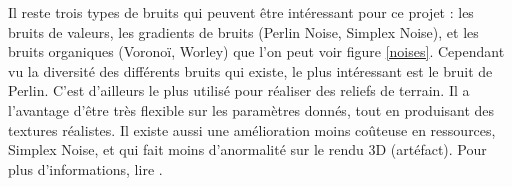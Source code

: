 \documentclass[a4paper]{article}
\begin{document}
        
    Il reste trois types de bruits qui peuvent être intéressant pour ce projet : les bruits de valeurs, les gradients de bruits (Perlin Noise, Simplex Noise), et les bruits organiques (Voronoï, Worley) que l'on peut voir figure  \ref{noises}. Cependant vu la diversité des différents bruits qui existe, le plus intéressant est le bruit de Perlin. C'est d'ailleurs le plus utilisé pour réaliser des reliefs de terrain. Il a l'avantage d'être très flexible sur les paramètres donnés, tout en produisant des textures réalistes. Il existe aussi une amélioration moins coûteuse en ressources, Simplex Noise, et qui fait moins d'anormalité sur le rendu 3D (artéfact). Pour plus d'informations, lire \cite{BookShader}.\\
\end{document}
